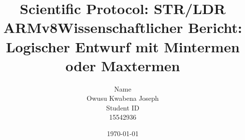 \documentclass[a4paper,12pt]{book} %
\begin{document}
{\title{Scientific Protocol: STR/LDR ARMv8}}
{\title{Wissenschaftlicher Bericht: Logischer Entwurf mit Mintermen oder Maxtermen}}
\author{Name \\ Owusu Kwabena Joseph  \\ Student ID \\15542936}
\date{\today}
\begin{titlepage}
  \maketitle
  \thispagestyle{empty}
\end{titlepage}
\thispagestyle{empty}
\newpage
\setcounter{chapter}{0}

\printbibliography
\end{document}

